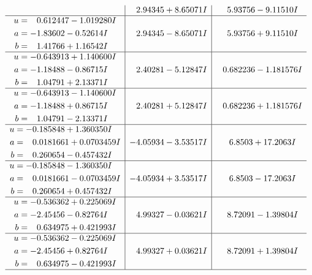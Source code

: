\documentclass[1p]{elsarticle_modified}
\theoremstyle{definition}
\begin{document}
$$\begin{array}{c|c|c}
 & \phantom{-}2.94345 + 8.65071 I & \phantom{-}5.93756 - 9.11510 I \\ \hline\begin{aligned}
u &= \phantom{-}0.612447 - 1.019280 I \\
a &= -1.83602 - 0.52614 I \\
b &= \phantom{-}1.41766 + 1.16542 I\end{aligned}
 & \phantom{-}2.94345 - 8.65071 I & \phantom{-}5.93756 + 9.11510 I \\ \hline\begin{aligned}
u &= -0.643913 + 1.140600 I \\
a &= -1.18488 - 0.86715 I \\
b &= \phantom{-}1.04791 + 2.13371 I\end{aligned}
 & \phantom{-}2.40281 - 5.12847 I & \phantom{-}0.682236 - 1.181576 I \\ \hline\begin{aligned}
u &= -0.643913 - 1.140600 I \\
a &= -1.18488 + 0.86715 I \\
b &= \phantom{-}1.04791 - 2.13371 I\end{aligned}
 & \phantom{-}2.40281 + 5.12847 I & \phantom{-}0.682236 + 1.181576 I \\ \hline\begin{aligned}
u &= -0.185848 + 1.360350 I \\
a &= \phantom{-}0.0181661 + 0.0703459 I \\
b &= \phantom{-}0.260654 - 0.457432 I\end{aligned}
 & -4.05934 - 3.53517 I & \phantom{-}6.8503 + 17.2063 I \\ \hline\begin{aligned}
u &= -0.185848 - 1.360350 I \\
a &= \phantom{-}0.0181661 - 0.0703459 I \\
b &= \phantom{-}0.260654 + 0.457432 I\end{aligned}
 & -4.05934 + 3.53517 I & \phantom{-}6.8503 - 17.2063 I \\ \hline\begin{aligned}
u &= -0.536362 + 0.225069 I \\
a &= -2.45456 - 0.82764 I \\
b &= \phantom{-}0.634975 + 0.421993 I\end{aligned}
 & \phantom{-}4.99327 - 0.03621 I & \phantom{-}8.72091 - 1.39804 I \\ \hline\begin{aligned}
u &= -0.536362 - 0.225069 I \\
a &= -2.45456 + 0.82764 I \\
b &= \phantom{-}0.634975 - 0.421993 I\end{aligned}
 & \phantom{-}4.99327 + 0.03621 I & \phantom{-}8.72091 + 1.39804 I\\
 \hline 
 \end{array}$$\newpage
\end{document}
